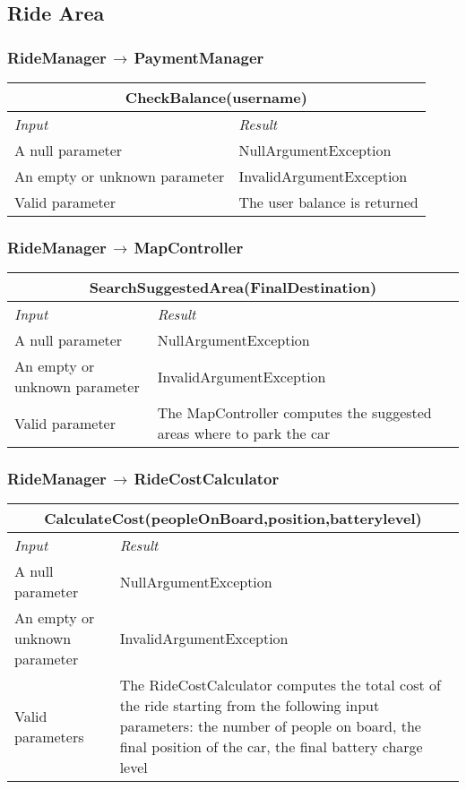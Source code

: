 \documentclass[11pt,a4paper]{report}
\begin{document}
\subsection{Ride Area}
\subsubsection{RideManager$\,\to\,$PaymentManager}
\begin{tabularx}{\textwidth}{|X|X|}
	\hline
	\multicolumn{2}{|c|}{\textbf{CheckBalance(username)}}\\
	\hline
	\textit{Input} & \textit{Result}\\
	\hline
	A null parameter & NullArgumentException\\
	\hline
	An empty or unknown parameter & InvalidArgumentException\\
	\hline
	Valid parameter & The user balance is returned\\
	\hline
\end{tabularx}
\subsubsection{RideManager$\,\to\,$MapController}
\begin{tabularx}{\textwidth}{|X|X|}
	\hline
	\multicolumn{2}{|c|}{\textbf{SearchSuggestedArea(FinalDestination)}}\\
	\hline
	\textit{Input} & \textit{Result}\\
	\hline
	A null parameter & NullArgumentException\\
	\hline
	An empty or unknown parameter & InvalidArgumentException\\
	\hline
	Valid parameter & The MapController computes the suggested areas where to park the car\\
	\hline
\end{tabularx}
\subsubsection{RideManager$\,\to\,$RideCostCalculator}
\begin{tabularx}{\textwidth}{|X|X|}
	\hline
	\multicolumn{2}{|c|}{\textbf{CalculateCost(peopleOnBoard,position,batterylevel)}}\\
	\hline
	\textit{Input} & \textit{Result}\\
	\hline
	A null parameter & NullArgumentException\\
	\hline
	An empty or unknown parameter & InvalidArgumentException\\
	\hline
	Valid parameters & The RideCostCalculator computes the total cost of the ride starting from the following input parameters: the number of people on board, the final position of the car, the final battery charge level\\
	\hline
\end{tabularx}
\end{document}
